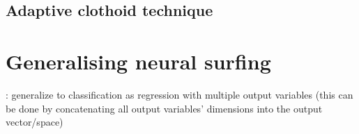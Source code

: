\section{Adaptive clothoid technique}
\todo



\chapter{Generalising neural surfing}
\todo: generalize to classification as regression with multiple output variables (this can be done by concatenating all output variables' dimensions into the output vector/space)

